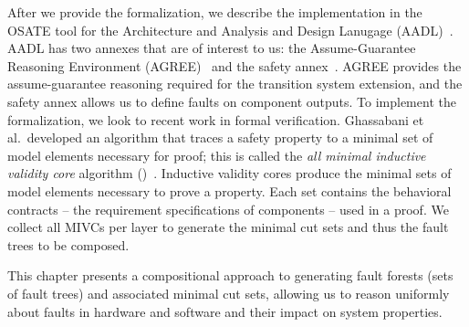 After we provide the formalization, we describe the implementation in the OSATE tool for the Architecture and Analysis and Design Lanugage (AADL)~\cite{FeilerModelBasedEngineering2012}. AADL has two annexes that are of interest to us: the Assume-Guarantee Reasoning Environment (AGREE)~\cite{NFM2012:CoGaMiWhLaLu} and the safety annex~\cite{stewart2020safety}. AGREE provides the assume-guarantee reasoning required for the transition system extension, and the safety annex allows us to define faults on component outputs. To implement the formalization, we look to recent work in formal verification. Ghassabani et al.~developed an algorithm that traces a safety property to a minimal set of model elements necessary for proof; this is called the \textit{all minimal inductive validity core} algorithm (\aivcalg)~\cite{GhassabaniGW16,Ghassabani2017EfficientGO}. Inductive validity cores produce the minimal sets of model elements necessary to prove a property. Each set contains the behavioral contracts -- the requirement specifications of components -- used in a proof. We collect all MIVCs per layer to generate the minimal cut sets and thus the fault trees to be composed.


This chapter presents a compositional approach to generating fault forests (sets of fault trees) and associated minimal cut sets, allowing us to reason uniformly about faults in hardware and software and their impact on system properties. 






